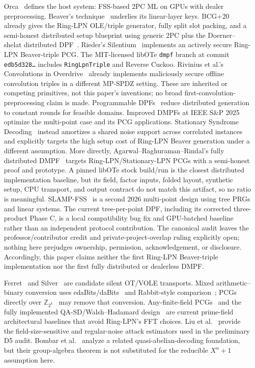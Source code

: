 \documentclass[11pt]{article}
\begin{document}
Orca~\cite{jawalkar2024orca} defines the host system: FSS-based 2PC ML on
GPUs with dealer preprocessing. Beaver's technique~\cite{beaver1991}
underlies its linear-layer keys. BCG+20~\cite{boyle2020ringlpn} already gives
the Ring-LPN OLE/triple generator, fully split slot packing, and a semi-honest
distributed setup blueprint using generic 2PC plus the Doerner--shelat
distributed DPF~\cite{doerner2017floram}. Rieder's
Silentium~\cite{rieder2025silentium} implements an actively secure Ring-LPN
Beaver-triple PCG. The MIT-licensed libOTe \texttt{dmpf} branch at commit
\texttt{edb5d328\ldots} includes \texttt{RingLpnTriple} and Reverse Cuckoo.
Rivinius et al.'s Convolutions in Overdrive~\cite{rivinius2023convolutions}
already implements maliciously secure offline convolution triples in a
different MP-SPDZ setting. These are inherited or competing primitives, not
this paper's inventions; no broad first-convolution-preprocessing claim is made.
Programmable DPFs~\cite{boyle2022programmable} reduce distributed generation
to constant rounds for feasible domains. Improved DMPFs at IEEE S\&P
2025~\cite{boyle2025dmpf} optimize the multi-point case and its PCG
applications. Stationary Syndrome Decoding~\cite{kolesnikov2025stationary}
instead amortizes a shared noise support across correlated instances and
explicitly targets the high setup cost of Ring-LPN Beaver generation under a
different assumption. More directly, Agarwal--Raghuraman--Rindal's fully
distributed DMPF~\cite{agarwal2026dmpf} targets Ring-LPN/Stationary-LPN PCGs
with a semi-honest proof and prototype. A pinned libOTe stock build/run is the
closest distributed implementation baseline, but its field, factor inputs,
folded layout, synthetic setup, CPU transport, and output contract do not match
this artifact, so no ratio is meaningful. SLAMP-FSS~\cite{kulaots2026slamp} is
a second 2026 multi-point design using tree PRGs and linear systems. The current
tree-per-point DPF, including its corrected three-product Phase C, is a local
compatibility bug fix and GPU-batched baseline rather than an independent
protocol contribution. The canonical audit leaves the professor/contributor
credit and private-project-overlap ruling explicitly open; nothing here
prejudges ownership, permission, acknowledgement, or disclosure. Accordingly,
this paper claims neither the first Ring-LPN Beaver-triple implementation nor
the first fully distributed or dealerless DMPF.

Ferret~\cite{yang2020ferret} and Silver~\cite{couteau2021silver} are candidate
silent OT/VOLE transports. Mixed arithmetic--binary conversion uses
edaBits/daBits~\cite{escudero2020edabits} and Rabbit-style
comparison~\cite{makri2021rabbit}; PCGs directly over
$\mathbb Z_{2^k}$~\cite{li2025galoisring} may remove that conversion.
Any-finite-field PCGs~\cite{li2025finitefield} and the fully implemented
QA-SD/Walsh--Hadamard design~\cite{li2026wht} are current prime-field
architectural baselines that avoid Ring-LPN's FFT choices. Liu et
al.~\cite{liu2024hardness} provide the field-size-sensitive and regular-noise
attack estimators used in the preliminary D5 audit.
Bombar et al.~\cite{bombar2023quasiabelian} analyze a related
quasi-abelian-decoding foundation, but their group-algebra theorem is not
substituted for the reducible $X^n+1$ assumption here.
\end{document}
